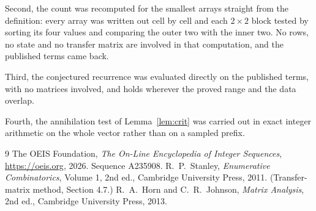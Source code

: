 \documentclass[11pt,a4paper]{article}
\theoremstyle{plain}
\theoremstyle{definition}
\begin{document}
Second, the count was recomputed for the smallest arrays straight from the definition: every
array was written out cell by cell and each $2\times2$ block tested by sorting its four values
and comparing the outer two with the inner two. No rows, no state and no transfer matrix are
involved in that computation, and the published terms came back.

Third, the conjectured recurrence was evaluated directly on the published terms, with no
matrices involved, and holds wherever the proved range and the data overlap.

Fourth, the annihilation test of Lemma~\ref{lem:crit} was carried out in exact integer
arithmetic on the whole vector rather than on a sampled prefix.

\begin{thebibliography}{9}
 The OEIS Foundation, \emph{The On-Line Encyclopedia of Integer
Sequences}, \url{https://oeis.org}, 2026. Sequence A235908.
 R.~P.~Stanley, \emph{Enumerative Combinatorics}, Volume 1, 2nd ed.,
Cambridge University Press, 2011. (Transfer-matrix method, Section 4.7.)
 R.~A.~Horn and C.~R.~Johnson, \emph{Matrix Analysis}, 2nd ed., Cambridge
University Press, 2013.
\end{thebibliography}
\end{document}

